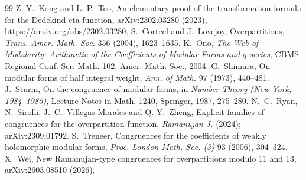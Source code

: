 \documentclass[11pt]{article}
\theoremstyle{remark}\newtheorem{remark}[theorem]{Remark}
\begin{document}
\begin{thebibliography}{99}
 Z.-Y.~Kong and L.-P.~Teo, An elementary proof of the transformation formula for the Dedekind eta function, arXiv:2302.03280 (2023), \url{https://arxiv.org/abs/2302.03280}.
 S.~Corteel and J.~Lovejoy, Overpartitions, \emph{Trans. Amer. Math. Soc.} 356 (2004), 1623--1635.
 K.~Ono, \emph{The Web of Modularity: Arithmetic of the Coefficients of Modular Forms and $q$-series}, CBMS Regional Conf. Ser. Math. 102, Amer. Math. Soc., 2004.
 G.~Shimura, On modular forms of half integral weight, \emph{Ann. of Math.} 97 (1973), 440--481.
 J.~Sturm, On the congruence of modular forms, in \emph{Number Theory (New York, 1984--1985)}, Lecture Notes in Math. 1240, Springer, 1987, 275--280.
 N.~C.~Ryan, N.~Sirolli, J.~C.~Villegas-Morales and Q.-Y.~Zheng, Explicit families of congruences for the overpartition function, \emph{Ramanujan J.} (2024); arXiv:2309.01792.
 S.~Treneer, Congruences for the coefficients of weakly holomorphic modular forms, \emph{Proc. London Math. Soc. (3)} 93 (2006), 304--324.
 X.~Wei, New Ramanujan-type congruences for overpartitions modulo 11 and 13, arXiv:2603.08510 (2026).
\end{thebibliography}
\end{document}
